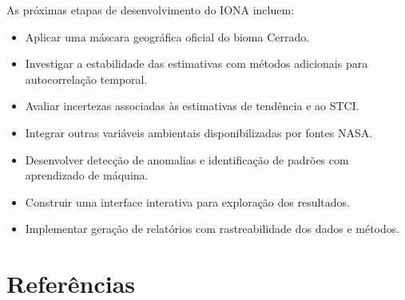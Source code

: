 \documentclass[12pt,a4paper]{article}
\begin{document}
As próximas etapas de desenvolvimento do IONA incluem:

\begin{itemize}
    \item Aplicar uma máscara geográfica oficial
    do bioma Cerrado.
    \item Investigar a estabilidade das estimativas
    com métodos adicionais para autocorrelação temporal.
    \item Avaliar incertezas associadas às estimativas
    de tendência e ao STCI.
    \item Integrar outras variáveis ambientais
    disponibilizadas por fontes NASA.
    \item Desenvolver detecção de anomalias e
    identificação de padrões com aprendizado de máquina.
    \item Construir uma interface interativa para
    exploração dos resultados.
    \item Implementar geração de relatórios com
    rastreabilidade dos dados e métodos.
\end{itemize}

\section*{Referências}
\end{document}
